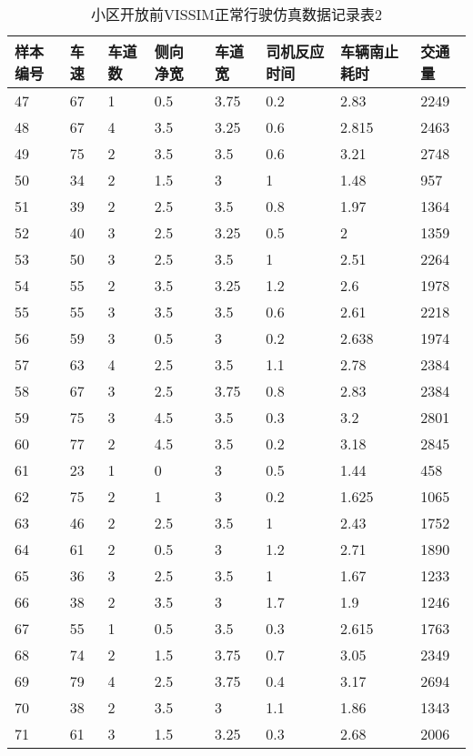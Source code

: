 \begin{table*}[h!]
  \centering
  \small
  \caption{小区开放前VISSIM正常行驶仿真数据记录表2}
\begin{tabular*}{\linewidth}{p{40pt}<{\centering}p{30pt}<{\centering}
p{30pt}<{\centering}p{40pt}<{\centering}p{50pt}<{\centering}p{70pt}<{\centering}
p{60pt}<{\centering}p{50pt}<{\centering}}
\toprule
样本编号 &  车速 & 车道数  & 侧向 净宽 &  车道宽  &  司机反应时间  & 车辆南止耗时  &  交通量  \\
\midrule
47 & 67 & 1 & 0.5 & 3.75 & 0.2 & 2.83 & 2249 \\
48 & 67 & 4 & 3.5 & 3.25 & 0.6 & 2.815 & 2463 \\
49 & 75 & 2 & 3.5 & 3.5 & 0.6 & 3.21 & 2748 \\
50 & 34 & 2 & 1.5 & 3 & 1 & 1.48 & 957 \\
51 & 39 & 2 & 2.5 & 3.5 & 0.8 & 1.97 & 1364 \\
52 & 40 & 3 & 2.5 & 3.25 & 0.5 & 2 & 1359 \\
53 & 50 & 3 & 2.5 & 3.5 & 1 & 2.51 & 2264 \\
54 & 55 & 2 & 3.5 & 3.25 & 1.2 & 2.6 & 1978 \\
55 & 55 & 3 & 3.5 & 3.5 & 0.6 & 2.61 & 2218 \\
56 & 59 & 3 & 0.5 & 3 & 0.2 & 2.638 & 1974 \\
57 & 63 & 4 & 2.5 & 3.5 & 1.1 & 2.78 & 2384 \\
58 & 67 & 3 & 2.5 & 3.75 & 0.8 & 2.83 & 2384 \\
59 & 75 & 3 & 4.5 & 3.5 & 0.3 & 3.2 & 2801 \\
60 & 77 & 2 & 4.5 & 3.5 & 0.2 & 3.18 & 2845 \\
61 & 23 & 1 & 0 & 3 & 0.5 & 1.44 & 458 \\
62 & 75 & 2 & 1 & 3 & 0.2 & 1.625 & 1065 \\
63 & 46 & 2 & 2.5 & 3.5 & 1 & 2.43 & 1752 \\
64 & 61 & 2 & 0.5 & 3 & 1.2 & 2.71 & 1890 \\
65 & 36 & 3 & 2.5 & 3.5 & 1 & 1.67 & 1233 \\
66 & 38 & 2 & 3.5 & 3 & 1.7 & 1.9 & 1246 \\
67 & 55 & 1 & 0.5 & 3.5 & 0.3 & 2.615 & 1763 \\
68 & 74 & 2 & 1.5 & 3.75 & 0.7 & 3.05 & 2349 \\
69 & 79 & 4 & 2.5 & 3.75 & 0.4 & 3.17 & 2694 \\
70 & 38 & 2 & 3.5 & 3 & 1.1 & 1.86 & 1343 \\
71 & 61 & 3 & 1.5 & 3.25 & 0.3 & 2.68 & 2006 \\

\end{tabular*}
\end{table*}
